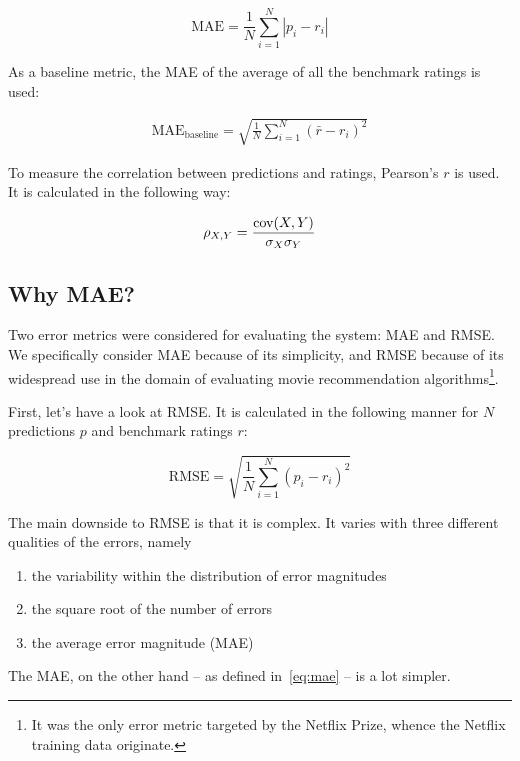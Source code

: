 \begin{equation}
  \text{MAE} = \frac{1}{N} \sum_{i=1}^N |p_i - r_i|
  \label{eq:mae}
\end{equation}

As a baseline metric, the MAE of the average of all the benchmark ratings is used:

\begin{align}
  \text{MAE}_\text{baseline} = \sqrt{ \frac{1}{N} \sum_{i=1}^N (\bar{r} - r_i)^2 }
\end{align}

To measure the correlation between predictions and ratings, Pearson's $r$ is used. It is calculated in the following way:

\begin{equation}
  \rho_{X,Y} = \frac{\operatorname{cov}(X, Y)}{\sigma_X \sigma_Y}
\end{equation}

\subsection{Why MAE?} %
\label{sub:why_mae}

Two error metrics were considered for evaluating the system: MAE and RMSE. We specifically consider MAE because of its simplicity, and RMSE because of its widespread use in the domain of evaluating movie recommendation algorithms\footnote{It was the only error metric targeted by the Netflix Prize, whence the Netflix training data originate.}.

First, let's have a look at RMSE. It is calculated in the following manner for $N$ predictions $p$ and benchmark ratings $r$:

\begin{equation}
  \text{RMSE} = \sqrt{ \frac{1}{N} \sum_{i=1}^N (p_i - r_i)^2 }
\end{equation}

The main downside to RMSE is that it is complex. It varies with three different qualities of the errors, namely

\begin{enumerate}
  \item the variability within the distribution of error magnitudes
  \item the square root of the number of errors
  \item the average error magnitude (MAE)
\end{enumerate}

The MAE, on the other hand -- as defined in~\eqref{eq:mae} -- is a lot simpler.

